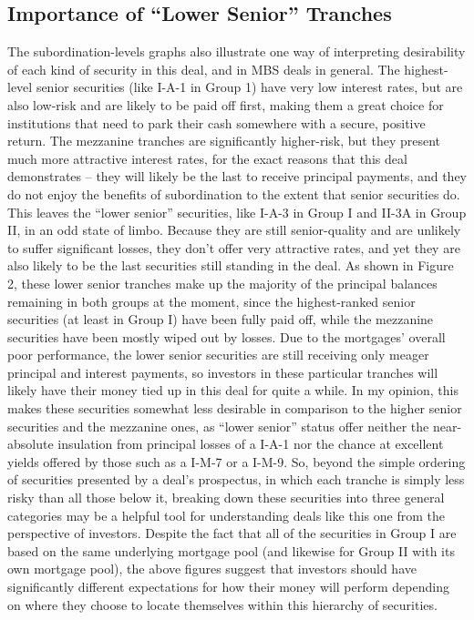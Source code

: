 \documentclass[12pt]{article}
\begin{document}
\subsection*{Importance of ``Lower Senior'' Tranches}

The subordination-levels graphs also illustrate one way of interpreting desirability of each kind of security in this deal, and in MBS deals in general. The highest-level senior securities (like I-A-1 in Group 1) have very low interest rates, but are also low-risk and are likely to be paid off first, making them a great choice for institutions that need to park their cash somewhere with a secure, positive return. The mezzanine tranches are significantly higher-risk, but they present much more attractive interest rates, for the exact reasons that this deal demonstrates – they will likely be the last to receive principal payments, and they do not enjoy the benefits of subordination to the extent that senior securities do. This leaves the “lower senior” securities, like I-A-3 in Group I and II-3A in Group II, in an odd state of limbo. Because they are still senior-quality and are unlikely to suffer significant losses, they don’t offer very attractive rates, and yet they are also likely to be the last securities still standing in the deal. As shown in Figure 2, these lower senior tranches make up the majority of the principal balances remaining in both groups at the moment, since the highest-ranked senior securities (at least in Group I) have been fully paid off, while the mezzanine securities have been mostly wiped out by losses. Due to the mortgages’ overall poor performance, the lower senior securities are still receiving only meager principal and interest payments, so investors in these particular tranches will likely have their money tied up in this deal for quite a while. In my opinion, this makes these securities somewhat less desirable in comparison to the higher senior securities and the mezzanine ones, as “lower senior” status offer neither the near-absolute insulation from principal losses of a I-A-1 nor the chance at excellent yields offered by those such as a I-M-7 or a I-M-9. So, beyond the simple ordering of securities presented by a deal’s prospectus, in which each tranche is simply less risky than all those below it, breaking down these securities into three general categories may be a helpful tool for understanding deals like this one from the perspective of investors. Despite the fact that all of the securities in Group I are based on the same underlying mortgage pool (and likewise for Group II with its own mortgage pool), the above figures suggest that investors should have significantly different expectations for how their money will perform depending on where they choose to locate themselves within this hierarchy of securities.
\end{document}
